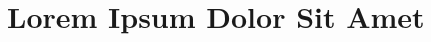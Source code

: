 \documentclass[12pt,a4paper, headsepline]{book}
\begin{document}
\maketitle
\thispagestyle{titleLower}	
\section{Lorem Ipsum Dolor Sit Amet}

\end{document}
